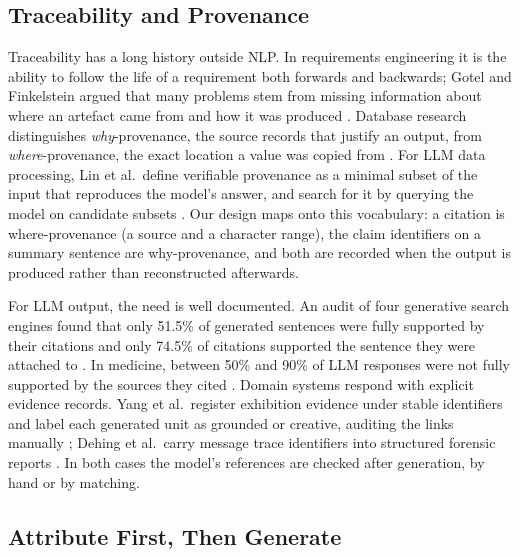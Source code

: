 \documentclass[runningheads]{llncs}
\begin{document}
\subsection{Traceability and Provenance}

Traceability has a long history outside NLP. In requirements engineering it is the ability to
follow the life of a requirement both forwards and backwards; Gotel and Finkelstein argued that many
problems stem from missing information about where an artefact came from and how it was produced
\cite{gotel1994traceability}. Database research distinguishes \emph{why}-provenance, the
source records that justify an output, from \emph{where}-provenance, the exact location a value was
copied from \cite{buneman2001provenance}. For LLM data processing, Lin et al.\ define verifiable
provenance as a minimal subset of the input that reproduces the model's answer, and search for it by
querying the model on candidate subsets \cite{lin2026blip}. Our design maps onto this vocabulary:
a citation is where-provenance (a source and a character range), the claim identifiers on a summary
sentence are why-provenance, and both are recorded when the output is produced rather than
reconstructed afterwards.

For LLM output, the need is well documented. An audit of four generative search engines found that
only 51.5\% of generated sentences were fully supported by their citations and only 74.5\% of
citations supported the sentence they were attached to \cite{liu2023verifiability}. In medicine,
between 50\% and 90\% of LLM responses were not fully supported by the sources they cited
\cite{wu2025sourcecheckup}. Domain
systems respond with explicit evidence records. Yang et al.\ register exhibition evidence under
stable identifiers and label each generated unit as grounded or creative, auditing the links
manually \cite{yang2026traceable}; Dehing et al.\ carry message trace identifiers into structured
forensic reports \cite{dehing2026forensics}. In both cases the model's references are checked after generation, by
hand or by matching.

\subsection{Attribute First, Then Generate}
\end{document}
